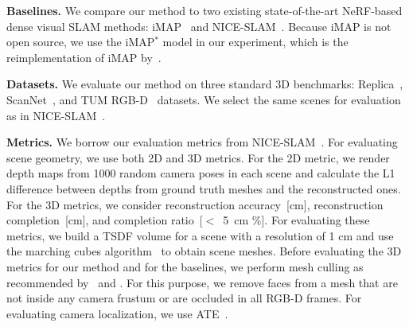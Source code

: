 \vspace{1ex}
\noindent\textbf{Baselines.} We compare our method to two existing state-of-the-art NeRF-based dense visual SLAM methods: iMAP~\citep{sucar2021imap} and NICE-SLAM~\citep{zhu2022nice}. Because iMAP is not open source, we use the iMAP$^*$ model in our experiment, which is the reimplementation of iMAP by~\cite{zhu2022nice}.

\vspace{1ex}
\noindent\textbf{Datasets.} We evaluate our method on three standard 3D benchmarks: Replica~\citep{replica19arxiv}, ScanNet~\citep{dai2017scannet}, and TUM RGB-D~\citep{sturm2012benchmark} datasets. We select the same scenes for evaluation as in NICE-SLAM~\citep{zhu2022nice}.

\vspace{1ex}
\noindent\textbf{Metrics.} We borrow our evaluation metrics from NICE-SLAM~\citep{zhu2022nice}. For evaluating scene geometry, we use both 2D and 3D metrics. For the 2D metric, we render depth maps from 1000 random camera poses in each scene and calculate the L1 difference between depths from ground truth meshes and the reconstructed ones. For the 3D metrics, we consider reconstruction accuracy~[cm], reconstruction completion~[cm], and completion ratio~[$<$~5~cm \%]. For evaluating these metrics, we build a TSDF volume for a scene with a resolution of 1 cm and use the marching cubes algorithm~\citep{lorensen1987marching} to obtain scene meshes. Before evaluating the 3D metrics for our method and for the baselines, we perform mesh culling as recommended by~\cite{azinovic2022neural} and \cite{wang2022go}. For this purpose, we remove faces from a mesh that are not inside any camera frustum or are occluded in all RGB-D frames. For evaluating camera localization, we use ATE~\citep{sturm2012benchmark}.


